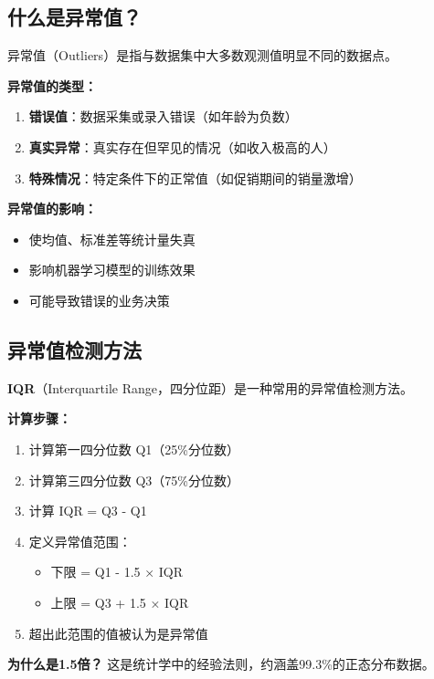 \documentclass[12pt,a4paper]{article}
\begin{document}
\subsection{什么是异常值？}

\begin{theorybox}[异常值的定义和类型]
异常值（Outliers）是指与数据集中大多数观测值明显不同的数据点。

\textbf{异常值的类型：}
\begin{enumerate}
    \item \textbf{错误值}：数据采集或录入错误（如年龄为负数）
    \item \textbf{真实异常}：真实存在但罕见的情况（如收入极高的人）
    \item \textbf{特殊情况}：特定条件下的正常值（如促销期间的销量激增）
\end{enumerate}

\textbf{异常值的影响：}
\begin{itemize}
    \item 使均值、标准差等统计量失真
    \item 影响机器学习模型的训练效果
    \item 可能导致错误的业务决策
\end{itemize}
\end{theorybox}

\subsection{异常值检测方法}

\begin{theorybox}
\textbf{IQR}（Interquartile Range，四分位距）是一种常用的异常值检测方法。

\textbf{计算步骤：}
\begin{enumerate}
    \item 计算第一四分位数 Q1（25\%分位数）
    \item 计算第三四分位数 Q3（75\%分位数）
    \item 计算 IQR = Q3 - Q1
    \item 定义异常值范围：
    \begin{itemize}
        \item 下限 = Q1 - 1.5 × IQR
        \item 上限 = Q3 + 1.5 × IQR
    \end{itemize}
    \item 超出此范围的值被认为是异常值
\end{enumerate}

\textbf{为什么是1.5倍？} 这是统计学中的经验法则，约涵盖99.3\%的正态分布数据。
\end{theorybox}
\end{document}
